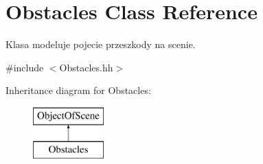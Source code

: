 \hypertarget{class_obstacles}{}\section{Obstacles Class Reference}
\label{class_obstacles}


Klasa modeluje pojecie przeszkody na scenie.  




{\ttfamily \#include $<$Obstacles.\+hh$>$}

Inheritance diagram for Obstacles\+:\begin{figure}[H]
\begin{center}
\leavevmode
\includegraphics[height=2.000000cm]{class_obstacles}
\end{center}
\end{figure}
